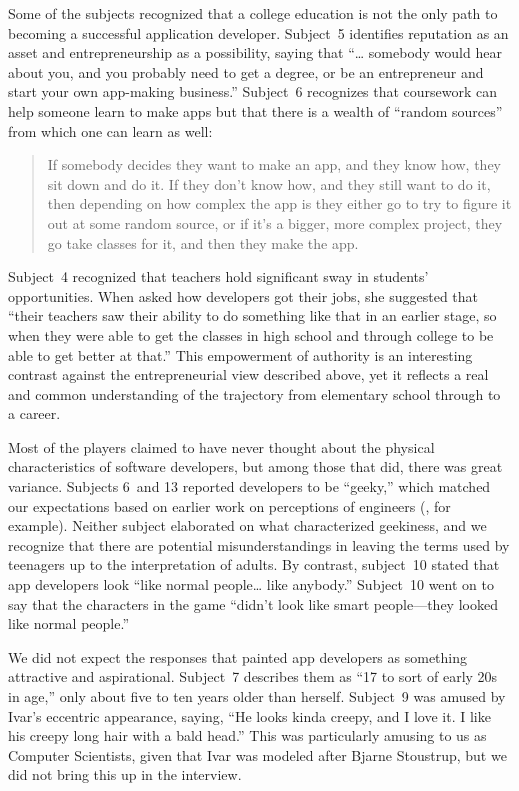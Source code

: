 \documentclass[letterpaper]{article}
\begin{document}
Some of the subjects recognized that a college education is not the only
path to becoming a successful application developer.
Subject~5 identifies reputation as an asset and entrepreneurship as a 
possibility, saying that ``\ldots{} somebody would hear about you, and you probably need to get a degree, or be an entrepreneur and start your own app-making business.''
Subject~6 recognizes that coursework can help someone learn to make apps
but that there is a wealth of ``random sources'' from which one can learn
as well:
\begin{quote}
If somebody decides they want to make 
an app, and they know how, they sit down and do it. If they don't know how,
and they still want to do it, then depending on how complex the app is they 
either go to try to figure it out at some random source, or if it's a bigger,
more complex project, they go take classes for it, and then they make the app.
\end{quote}

Subject~4 recognized that teachers hold significant sway in students'
opportunities. When asked how developers got their jobs, she suggested
that ``their teachers saw their ability to do something
like that in an earlier stage, so when they were able to get
the classes in high school and through college to be able to get better
at that.''
This empowerment of authority is an interesting contrast
against the entrepreneurial view described above,
yet it reflects a real and common understanding of the trajectory
from elementary school through to a career.




Most of the players claimed to have never thought about the physical
characteristics of software developers, but among those that did,
there was great variance.  Subjects 6~and 13 reported developers to be
``geeky,'' which matched our expectations based on earlier work on
perceptions of engineers (\citet{Margolis2003}, for example). Neither
subject elaborated on what characterized geekiness, and we recognize
that there are potential misunderstandings in leaving the terms used
by teenagers up to the interpretation of adults.  
By contrast,
subject~10 stated that app developers look ``like normal
people\ldots{} like anybody.''
Subject~10 went on to say that the characters in the game
``didn't look like smart people---they looked like normal people.''

We did not expect the responses that painted app developers as something
attractive and aspirational. Subject~7 describes them as ``17 to sort of
early 20s in age,'' only about five to ten years older than herself.
Subject~9 was amused by Ivar's eccentric appearance, saying, ``He looks
kinda creepy, and I love it. I like his creepy long hair with a bald head.''
This was particularly amusing to us as Computer Scientists, given that
Ivar was modeled after Bjarne Stoustrup, but we did not bring this up
in the interview.
\end{document}
